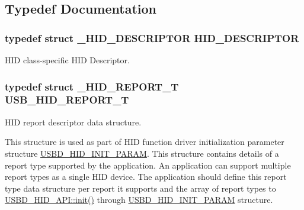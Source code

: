 \subsection{Typedef Documentation}
\hypertarget{group__USBD__HID_ga683d4339556ecbba7d2062c3f90336e8}{
\subsubsection[{H\-I\-D\-\_\-\-D\-E\-S\-C\-R\-I\-P\-T\-O\-R}]{\setlength{\rightskip}{0pt plus 5cm}typedef struct {\bf \-\_\-\-H\-I\-D\-\_\-\-D\-E\-S\-C\-R\-I\-P\-T\-O\-R} {\bf H\-I\-D\-\_\-\-D\-E\-S\-C\-R\-I\-P\-T\-O\-R}}}\label{group__USBD__HID_ga683d4339556ecbba7d2062c3f90336e8}
H\-I\-D class-\/specific H\-I\-D Descriptor. \hypertarget{group__USBD__HID_gaaa1686adb431783ea4357e6899c0d39d}{
\subsubsection[{U\-S\-B\-\_\-\-H\-I\-D\-\_\-\-R\-E\-P\-O\-R\-T\-\_\-\-T}]{\setlength{\rightskip}{0pt plus 5cm}typedef struct {\bf \-\_\-\-H\-I\-D\-\_\-\-R\-E\-P\-O\-R\-T\-\_\-\-T}  {\bf U\-S\-B\-\_\-\-H\-I\-D\-\_\-\-R\-E\-P\-O\-R\-T\-\_\-\-T}}}\label{group__USBD__HID_gaaa1686adb431783ea4357e6899c0d39d}


H\-I\-D report descriptor data structure. 

This structure is used as part of H\-I\-D function driver initialization parameter structure \hyperlink{structUSBD__HID__INIT__PARAM}{U\-S\-B\-D\-\_\-\-H\-I\-D\-\_\-\-I\-N\-I\-T\-\_\-\-P\-A\-R\-A\-M}. This structure contains details of a report type supported by the application. An application can support multiple report types as a single H\-I\-D device. The application should define this report type data structure per report it supports and the array of report types to \hyperlink{structUSBD__HID__API_a7b98c434713f1deb07abafcb52fae76d}{U\-S\-B\-D\-\_\-\-H\-I\-D\-\_\-\-A\-P\-I\-::init()} through \hyperlink{structUSBD__HID__INIT__PARAM}{U\-S\-B\-D\-\_\-\-H\-I\-D\-\_\-\-I\-N\-I\-T\-\_\-\-P\-A\-R\-A\-M} structure.

